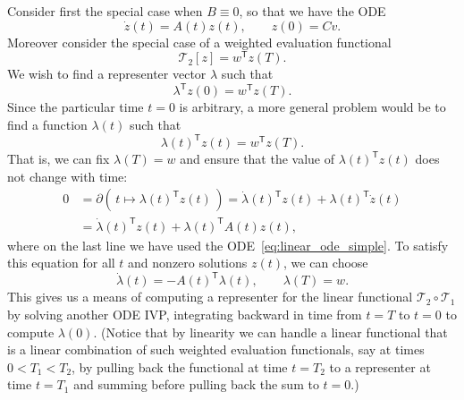 \documentclass{article}
\begin{document}
Consider first the special case when $B \equiv 0$, so that we have the ODE
\begin{equation}
    \dot z(t) = A(t) z(t), \qquad z(0) = C v.
    \label{eq:linear_ode_simple}
\end{equation}
Moreover consider the special case of a weighted evaluation functional
\begin{equation}
    \mathcal{T}_2[z] = w^\mathsf{T} z(T).
\end{equation}
We wish to find a representer vector $\lambda$ such that
\begin{equation}
\lambda^\mathsf{T} z(0) = w^\mathsf{T} z(T).
\end{equation}
Since the particular time $t=0$ is arbitrary, a more general problem would be
to find a function $\lambda(t)$ such that
\begin{equation}
    \lambda(t)^\mathsf{T} z(t) = w^\mathsf{T} z(T).
\end{equation}
That is, we can fix $\lambda(T) = w$ and ensure that the value of
$\lambda(t)^\mathsf{T} z(t)$ does not change with time:
\begin{align}
    0 &= \partial (\, t \mapsto \lambda(t)^\mathsf{T} z(t) \,)
    = \dot \lambda(t)^\mathsf{T} z(t) + \lambda(t)^\mathsf{T} \dot z(t)
    \\
    &= \dot \lambda(t)^\mathsf{T} z(t) + \lambda(t)^\mathsf{T} A(t) z(t),
\end{align}
where on the last line we have used the ODE~\eqref{eq:linear_ode_simple}.
To satisfy this equation for all $t$ and nonzero solutions $z(t)$, we can choose
\begin{equation}
    \dot \lambda(t) = - A(t)^\mathsf{T} \lambda(t), \qquad \lambda(T) = w.
\end{equation}
This gives us a means of computing a representer for the linear functional
$\mathcal{T}_2 \circ \mathcal{T}_1$ by solving another ODE IVP, integrating
backward in time from $t=T$ to $t=0$ to compute $\lambda(0)$.
(Notice that by linearity we can handle a linear functional that is a linear
combination of such weighted evaluation functionals, say at times $0 < T_1 <
T_2$, by pulling back the functional at time $t=T_2$ to a representer at time
$t=T_1$ and summing before pulling back the sum to $t=0$.)
\end{document}
